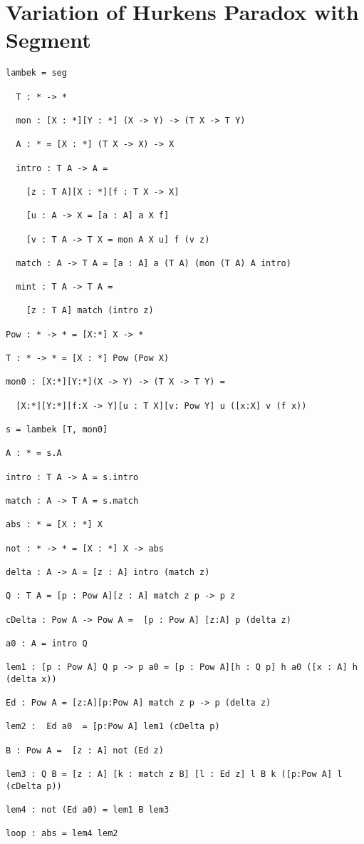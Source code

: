 \section{Variation of Hurkens Paradox with Segment}\label{apdix:paradox:seg}
\begin{Verbatim}[fontsize=\small]
 lambek = seg

  T : * -> *

  mon : [X : *][Y : *] (X -> Y) -> (T X -> T Y)

  A : * = [X : *] (T X -> X) -> X

  intro : T A -> A =

    [z : T A][X : *][f : T X -> X]

    [u : A -> X = [a : A] a X f]

    [v : T A -> T X = mon A X u] f (v z)

  match : A -> T A = [a : A] a (T A) (mon (T A) A intro)

  mint : T A -> T A =

    [z : T A] match (intro z)

Pow : * -> * = [X:*] X -> *

T : * -> * = [X : *] Pow (Pow X)

mon0 : [X:*][Y:*](X -> Y) -> (T X -> T Y) =

  [X:*][Y:*][f:X -> Y][u : T X][v: Pow Y] u ([x:X] v (f x))

s = lambek [T, mon0]

A : * = s.A

intro : T A -> A = s.intro

match : A -> T A = s.match

abs : * = [X : *] X

not : * -> * = [X : *] X -> abs

delta : A -> A = [z : A] intro (match z)

Q : T A = [p : Pow A][z : A] match z p -> p z

cDelta : Pow A -> Pow A =  [p : Pow A] [z:A] p (delta z)

a0 : A = intro Q

lem1 : [p : Pow A] Q p -> p a0 = [p : Pow A][h : Q p] h a0 ([x : A] h (delta x))

Ed : Pow A = [z:A][p:Pow A] match z p -> p (delta z)

lem2 :  Ed a0  = [p:Pow A] lem1 (cDelta p)

B : Pow A =  [z : A] not (Ed z)

lem3 : Q B = [z : A] [k : match z B] [l : Ed z] l B k ([p:Pow A] l (cDelta p))

lem4 : not (Ed a0) = lem1 B lem3

loop : abs = lem4 lem2
\end{Verbatim}

